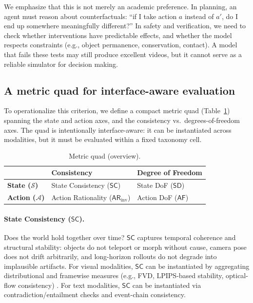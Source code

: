 \documentclass{article}
\theoremstyle{plain}
\theoremstyle{definition}
\theoremstyle{remark}
\begin{document}
We emphasize that this is not merely an academic preference. In planning, an agent must reason about counterfactuals: ``if I take action $a$ instead of $a'$, do I end up somewhere meaningfully different?'' In safety and verification, we need to check whether interventions have predictable effects, and whether the model respects constraints (e.g., object permanence, conservation, contact). A model that fails these tests may still produce excellent videos, but it cannot serve as a reliable simulator for decision making.

\subsection{A metric quad for interface-aware evaluation}
To operationalize this criterion, we define a compact metric quad (Table~\ref{tab:metric_quad_overview}) spanning the state and action axes, and the consistency vs.\ degrees-of-freedom axes. The quad is intentionally interface-aware: it can be instantiated across modalities, but it must be evaluated within a fixed taxonomy cell.

\begin{table}[t]
\centering
\small
\caption{Metric quad (overview).}
\label{tab:metric_quad_overview}
\setlength{\tabcolsep}{3pt}
\begin{tabularx}{\columnwidth}{@{}l|>{\raggedright\arraybackslash}X>{\raggedright\arraybackslash}X@{}}
\toprule
 & \textbf{Consistency} & \textbf{Degree of Freedom} \\
\midrule
\textbf{State ($\mathcal{S}$)}
 & State Consistency ($\mathsf{SC}$)
 & State DoF ($\mathsf{SD}$) \\
\textbf{Action ($\mathcal{A}$)}
 & Action Rationality ($\mathsf{AR}_{\text{inv}}$)
 & Action DoF ($\mathsf{AF}$) \\
\bottomrule
\end{tabularx}
\end{table}

\paragraph{State Consistency ($\mathsf{SC}$).}
Does the world hold together over time? $\mathsf{SC}$ captures temporal coherence and structural stability: objects do not teleport or morph without cause, camera pose does not drift arbitrarily, and long-horizon rollouts do not degrade into implausible artifacts. For visual modalities, $\mathsf{SC}$ can be instantiated by aggregating distributional and framewise measures (e.g., FVD, LPIPS-based stability, optical-flow consistency) \cite{unterthiner2019fvd,zhang2018lpips}. For text modalities, $\mathsf{SC}$ can be instantiated via contradiction/entailment checks and event-chain consistency.
\end{document}
